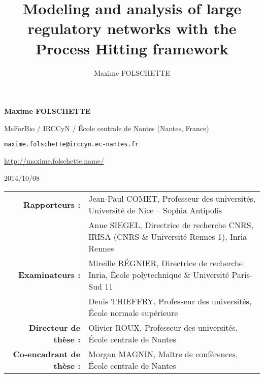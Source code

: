 \documentclass[fleqn,8pt,t]{beamer}
\date{\thedate}
\title[Modeling and analysis of large RN with the PH framework]%
  {Modeling and analysis of large regulatory networks with the Process Hitting framework}
\author{Maxime FOLSCHETTE}
\newcommand{\tval}[1]{\textbf{#1}}
\newcommand{\thedate}{2014/10/08}
\begin{document}
\begin{frame}[plain,label=title]

\begin{center}
\vfill
\textcolor{couleurtheme}{}

\par
\medskip
\bigskip
\normalsize
\tval{Maxime FOLSCHETTE}

\medskip
\footnotesize
MeForBio / IRCCyN / École centrale de Nantes (Nantes, France)

\texttt{maxime.folschette@irccyn.ec-nantes.fr}

\url{http://maxime.folschette.name/}

\bigskip

\normalsize
\thedate
\end{center}

\scriptsize
\bigskip


\begin{tabular}{r@{\ \ }l}
\textbf{Rapporteurs :}
& Jean-Paul COMET, Professeur des universités,
    Université de Nice -- Sophia Antipolis \\
& Anne SIEGEL, Directrice de recherche CNRS,
    IRISA (CNRS \& Université Rennes 1), Inria Rennes \vspace*{1em} \\
\textbf{Examinateurs :}
& Mireille RÉGNIER, Directrice de recherche Inria,
    École polytechnique \& Université Paris-Sud 11 \\
& Denis THIEFFRY, Professeur des universités,
    École normale supérieure \vspace*{1em} \\
\textbf{Directeur de thèse :}
& Olivier ROUX, Professeur des universités,
    École centrale de Nantes \\
\textbf{Co-encadrant de thèse :}
& Morgan MAGNIN, Maître de conférences,
    École centrale de Nantes
\end{tabular}

\vfill

\end{frame}
\end{document}
